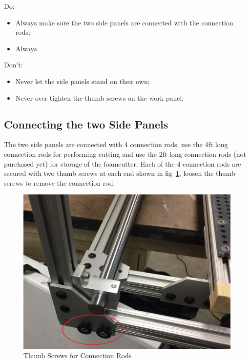 \documentclass[titlepage,10pt,letter]{report}
\numberwithin{equation}{chapter}
\begin{document}
\begin{tcolorbox}
	{\Large
\noindent Do:
\begin{itemize}[noitemsep,topsep=0pt]
	\item Always make sure the two side panels are connected with the connection rods;
	\item Always 
\end{itemize}

\noindent Don't:
\begin{itemize}[noitemsep,topsep=0pt]
	\item Never let the side panels stand on their own;
	\item Never over tighten the thumb screws on the work panel;
\end{itemize}
}
\end{tcolorbox}

\subsection{Connecting the two Side Panels}
The two side panels are connected with 4 connection rods, use the 4ft long connection rods for performing cutting and use the 2ft long connection rods (not purchased yet) for storage of the foamcutter. Each of the 4 connection rods are secured with two thumb screws at each end shown in fig~\ref{fig:thumb_screw}, loosen the thumb screws to remove the connection rod. 

\begin{figure} [H]
	\includegraphics[width = 0.9\linewidth]{./Figures/thumb_screw.jpg}
	\caption{Thumb Screws for Connection Rods}
	\label{fig:thumb_screw}
\end{figure}
\end{document}
